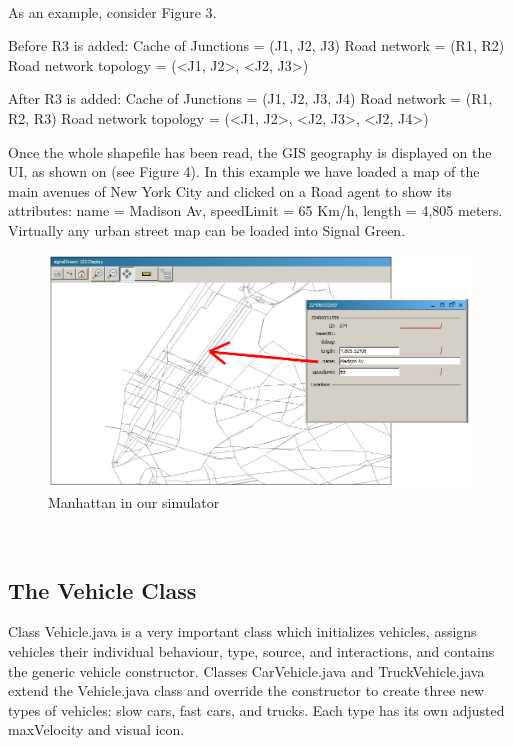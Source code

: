 \documentclass[11pt]{article}
\begin{document}
\\
As an example, consider Figure 3.

Before R3 is added:
Cache of Junctions = (J1, J2, J3)
Road network = (R1, R2)
Road network topology = (<J1, J2>, <J2, J3>)

After R3 is added:
Cache of Junctions = (J1, J2, J3, J4)
Road network = (R1, R2, R3)
Road network topology = (<J1, J2>, <J2, J3>, <J2, J4>)

Once the whole shapefile has been read, the GIS geography is displayed on the UI, as shown on (see Figure 4). In this example we have loaded a map of the main avenues of New York City and clicked on a Road agent to show its attributes: name = Madison Av, speedLimit = 65 Km/h, length = 4,805 meters. Virtually any urban street map can be loaded into Signal Green.
\\

\begin{figure}[h]
\begin{center}
\includegraphics[scale=0.4]{GIS_display_manhattan_loaded}
\caption{Manhattan in our simulator}
\end{center}
\end{figure}
\\

\subsection{The Vehicle Class}


Class Vehicle.java is a very important class which initializes vehicles, assigns vehicles their individual behaviour, type, source, and interactions, and contains the generic vehicle constructor. Classes CarVehicle.java and TruckVehicle.java extend the Vehicle.java class and override the constructor to create three new types of vehicles: slow cars, fast cars, and trucks. Each type has its own adjusted maxVelocity and visual icon. 
\end{document}
